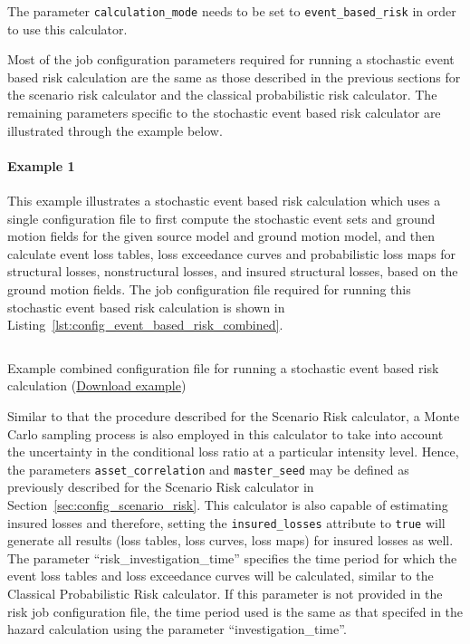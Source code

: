 The parameter \Verb+calculation_mode+ needs to be set to
\Verb+event_based_risk+ in order to use this calculator.

Most of the job configuration parameters required for running a stochastic
event based risk calculation are the same as those described in the previous
sections for the scenario risk calculator and the classical probabilistic risk
calculator. The remaining parameters specific to the stochastic event based
risk calculator are illustrated through the example below.


\paragraph{Example 1}

This example illustrates a stochastic event based risk calculation which uses
a single configuration file to first compute the stochastic event sets and
ground motion fields for the given source model and ground motion model, and
then calculate event loss tables, loss exceedance curves and probabilistic
loss maps for structural losses, nonstructural losses, and insured structural
losses, based on the ground motion fields. The job configuration file required
for running this stochastic event based risk calculation is shown in
Listing~\ref{lst:config_event_based_risk_combined}.

\begin{listing}[htbp]
  \inputminted[firstline=1,firstnumber=1,fontsize=\footnotesize,frame=single,bgcolor=lightgray,linenos,label=job.ini]{ini}{oqum/risk/verbatim/config_event_based_risk_combined.ini}
  \caption{Example combined configuration file for running a stochastic event based risk calculation (\href{https://raw.githubusercontent.com/GEMScienceTools/oq-engine-docs/master/oqum/risk/verbatim/config_event_based_risk_combined.xml}{Download example})}
  \label{lst:config_event_based_risk_combined}
\end{listing}

Similar to that the procedure described for the Scenario Risk calculator, a
Monte Carlo sampling process is also employed in this calculator to take into
account the uncertainty in the conditional loss ratio at a particular
intensity level. Hence, the parameters \Verb+asset_correlation+ and
\Verb+master_seed+ may be defined as previously described for the Scenario
Risk calculator in Section~\ref{sec:config_scenario_risk}. This calculator is
also capable of estimating insured losses and therefore, setting the
\Verb+insured_losses+ attribute to \Verb+true+ will generate all results (loss
tables, loss curves, loss maps) for insured losses as well. The parameter
``risk\_investigation\_time'' specifies the time period for which the event
loss tables and loss exceedance curves will be calculated, similar to the
Classical Probabilistic Risk calculator. If this parameter is not provided in
the risk job configuration file, the time period used is the same as that
specifed in the hazard calculation using the parameter ``investigation\_time''.

